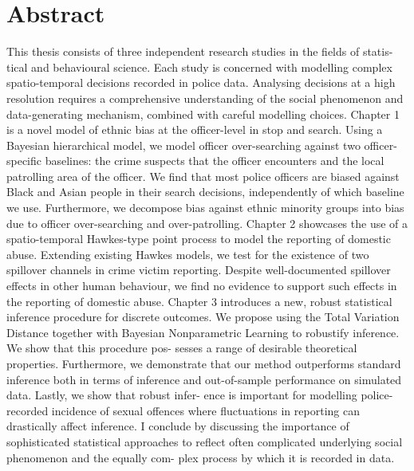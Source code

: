 
\chapter*{Abstract}%
\label{cha:abstract}


This thesis consists of three independent research studies in the fields of statis- tical and behavioural science. Each study is concerned with modelling complex spatio-temporal decisions recorded in police data. Analysing decisions at a high resolution requires a comprehensive understanding of the social phenomenon and data-generating mechanism, combined with careful modelling choices.
Chapter 1 is a novel model of ethnic bias at the officer-level in stop and search. Using a Bayesian hierarchical model, we model officer over-searching against two officer-specific baselines: the crime suspects that the officer encounters and the local patrolling area of the officer. We find that most police officers are biased against Black and Asian people in their search decisions, independently of which baseline we use. Furthermore, we decompose bias against ethnic minority groups into bias due to officer over-searching and over-patrolling.
Chapter 2 showcases the use of a spatio-temporal Hawkes-type point process to model the reporting of domestic abuse. Extending existing Hawkes models, we test for the existence of two spillover channels in crime victim reporting. Despite well-documented spillover effects in other human behaviour, we find no evidence to support such effects in the reporting of domestic abuse.
Chapter 3 introduces a new, robust statistical inference procedure for discrete outcomes. We propose using the Total Variation Distance together with Bayesian Nonparametric Learning to robustify inference. We show that this procedure pos- sesses a range of desirable theoretical properties. Furthermore, we demonstrate that our method outperforms standard inference both in terms of inference and out-of-sample performance on simulated data. Lastly, we show that robust infer- ence is important for modelling police-recorded incidence of sexual offences where fluctuations in reporting can drastically affect inference.
I conclude by discussing the importance of sophisticated statistical approaches to reflect often complicated underlying social phenomenon and the equally com- plex process by which it is recorded in data.
